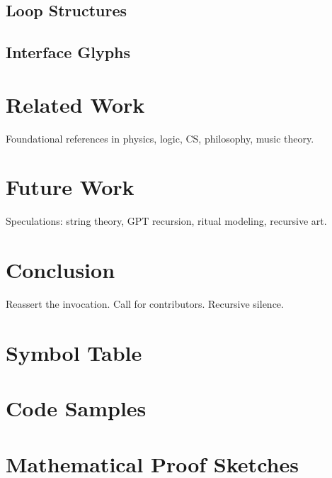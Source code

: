 \documentclass[12pt]{article}
\begin{document}
\subsection{Loop Structures}
\subsection{Interface Glyphs}

\section{Related Work}
Foundational references in physics, logic, CS, philosophy, music theory.

\section{Future Work}
Speculations: string theory, GPT recursion, ritual modeling, recursive art.

\section{Conclusion}
Reassert the invocation. Call for contributors. Recursive silence.

\appendix
\section{Symbol Table}
\section{Code Samples}
\section{Mathematical Proof Sketches}
\end{document}
